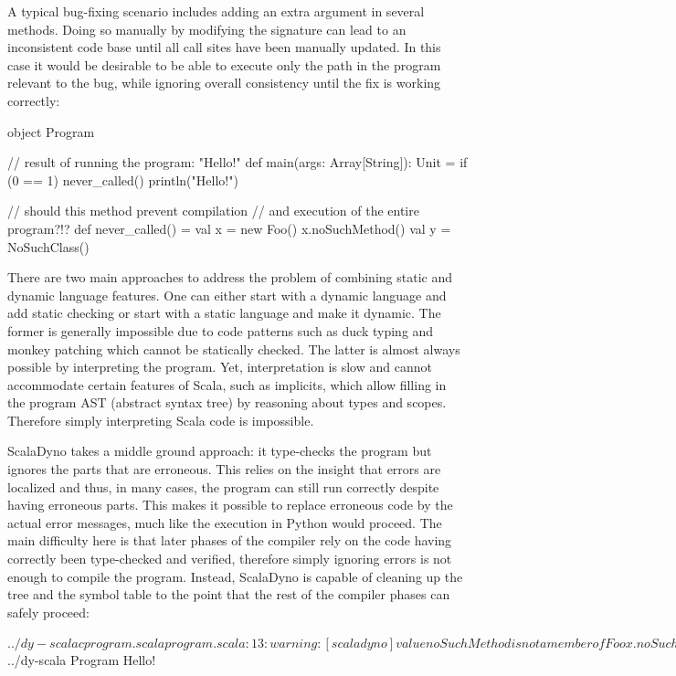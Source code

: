 A typical bug-fixing scenario includes adding an extra argument in several methods. Doing so manually by modifying the signature can lead to an inconsistent code base until all call sites have been manually updated. In this case it would be desirable to be able to execute only the path in the program relevant to the bug, while ignoring overall consistency until the fix is working correctly:

\begin{lstlisting-nobreak}
 object Program {
   // result of running the program: "Hello!"
   def main(args: Array[String]): Unit = {
     if (0 == 1)
       never_called()
     println("Hello!")
   }

   // should this method prevent compilation
   // and execution of the entire program?!?
   def never_called() = {
     val x = new Foo()
     x.noSuchMethod()
     val y = NoSuchClass()
   }
 }
\end{lstlisting-nobreak}

There are two main approaches to address the problem of combining static and dynamic language features. One can either start with a dynamic language and add static checking or start with a static language and make it dynamic. The former is generally impossible due to code patterns such as duck typing and monkey patching which cannot be statically checked. The latter is almost always possible by interpreting the program. Yet, interpretation is slow and cannot accommodate certain features of Scala, such as implicits, which allow filling in the program AST (abstract syntax tree) by reasoning about types and scopes. Therefore simply interpreting Scala code is impossible.

ScalaDyno takes a middle ground approach: it type-checks the program but ignores the parts that are erroneous. This relies on the insight that errors are localized and thus, in many cases, the program can still run correctly despite having erroneous parts. This makes it possible to replace erroneous code by the actual error messages, much like the execution in Python would proceed. The main difficulty here is that later phases of the compiler rely on the code having correctly been type-checked and verified, therefore simply ignoring errors is not enough to compile the program. Instead, ScalaDyno is capable of cleaning up the tree and the symbol table to the point that the rest of the compiler phases can safely proceed:

\begin{lstlisting-nobreak}
$ ../dy-scalac program.scala
program.scala:13: warning: [scaladyno] value noSuchMethod is not a member of Foo
     x.noSuchMethod()
       ^
program.scala:14: warning: [scaladyno] not found: value NoSuchClass
     val y = NoSuchClass()
             ^
two warnings found

$ ../dy-scala Program
Hello!
\end{lstlisting-nobreak}

